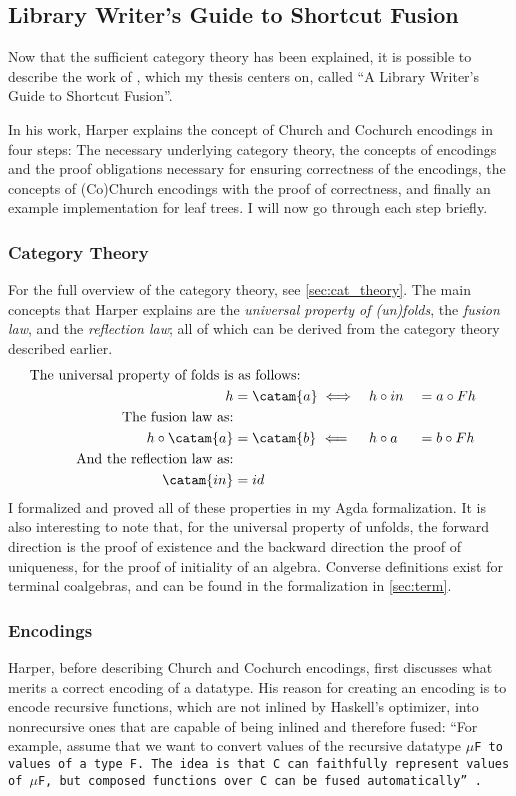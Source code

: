 \subsection{Library Writer's Guide to Shortcut Fusion}\label{sec:libfusion}
Now that the sufficient category theory has been explained, it is possible to describe the work of \cite{Harper2011}, which my thesis centers on, called ``A Library Writer's Guide to Shortcut Fusion''.

In his work, Harper explains the concept of Church and Cochurch encodings in four steps:
The necessary underlying category theory, the concepts of encodings and the proof obligations necessary for ensuring correctness of the encodings, the concepts of (Co)Church encodings with the proof of correctness, and finally an example implementation for leaf trees.
I will now go through each step briefly.

\subsubsection{Category Theory}
For the full overview of the category theory, see \autoref{sec:cat_theory}.
The main concepts that Harper explains are the \textit{universal property of (un)folds}, the \textit{fusion law}, and the \textit{reflection law}; all of which can be derived from the category theory described earlier.
\begin{alignat*}{3}
\text{The universal property of folds is}&\text{ as follows:} \\
h &= \catam{a} \iff && h \circ in &&= a \circ F h \\
\text{The fusion law as:} \\
h \circ \catam{a} &= \catam{b}~\Longleftarrow && h \circ a &&= b \circ F h \\
\text{And the reflection law as:} \\
\catam{in} &= id
\end{alignat*}
I formalized and proved all of these properties in my Agda formalization.
It is also interesting to note that, for the universal property of unfolds, the forward direction is the proof of existence and the backward direction the proof of uniqueness, for the proof of initiality of an algebra.
Converse definitions exist for terminal coalgebras, and can be found in the formalization in \autoref{sec:term}.

\subsubsection{Encodings}\label{sec:obligations}
Harper, before describing Church and Cochurch encodings, first discusses what merits a correct encoding of a datatype.
His reason for creating an encoding is to encode recursive functions, which are not inlined by Haskell's optimizer, into nonrecursive ones that are capable of being inlined and therefore fused:
``For example, assume that we want to convert values of the recursive datatype \tt{$\mu$F} to values of a type \tt{F}.  The idea is that \tt{C} can faithfully represent values of \tt{$\mu$F}, but composed functions over \tt{C} can be fused automatically'' \citep{Harper2011}.

